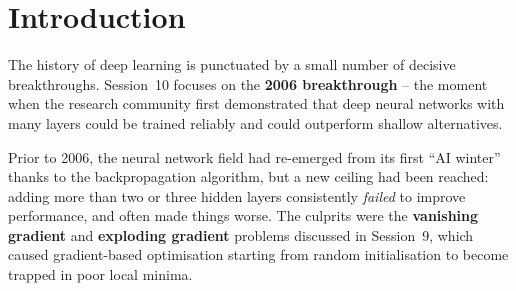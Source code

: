 \documentclass[12pt,a4paper]{article}
\begin{document}
\begin{titlepage}
  \begin{abstract}
    \noindent
    Session~10 covers the theoretical and empirical foundations of
    \emph{greedy layer-wise pre-training}, the pivotal technique introduced by
    Hinton et al.\ (2006) that made training deep networks feasible for the
    first time.  Starting from the observation that deep networks trained from
    random initialisation performed \emph{worse} than shallow networks due to
    vanishing/exploding gradients, the session explains how treating each hidden
    layer as a Restricted Boltzmann Machine (RBM) and pre-training it in
    isolation provides a principled weight initialisation.  The Bengio et al.\
    (2006, NIPS) supervised variant using auto-encoders is also presented.
    Landmark empirical results are reviewed: the deep generative model achieves
    1.25\% error on MNIST (vs.\ 1.4\% for SVM), and a DBN-DNN with 7 hidden
    layers achieves 17.1\% WER on the HUB500-SWB speech recognition benchmark
    (vs.\ 23.6\% for GMM-HMM).  The session concludes by contextualising why
    greedy pre-training is less necessary today given modern regularisation and
    optimisation advances (ReLU, batch normalisation, Adam), while noting its
    continued relevance for low-resource settings.
  \end{abstract}
\end{titlepage}

\tableofcontents
\newpage

\section{Introduction}
\label{sec:intro}

The history of deep learning is punctuated by a small number of decisive
breakthroughs.  Session~10 focuses on the \textbf{2006 breakthrough} -- the
moment when the research community first demonstrated that deep neural networks
with many layers could be trained reliably and could outperform shallow
alternatives.

Prior to 2006, the neural network field had re-emerged from its first ``AI
winter'' thanks to the backpropagation algorithm, but a new ceiling had been
reached: adding more than two or three hidden layers consistently \emph{failed}
to improve performance, and often made things worse.  The culprits were the
\textbf{vanishing gradient} and \textbf{exploding gradient} problems discussed
in Session~9, which caused gradient-based optimisation starting from random
initialisation to become trapped in poor local minima.
\end{document}
